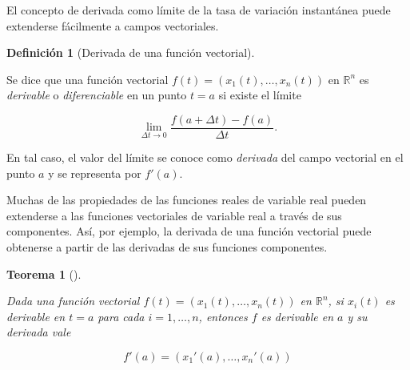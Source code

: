 \documentclass[
  a4paper,
]{scrreport}
\theoremstyle{definition}
\theoremstyle{plain}
\theoremstyle{plain}
\newtheorem{theorem}{Teorema}[chapter]
\theoremstyle{plain}
\theoremstyle{definition}
\newtheorem{definition}{Definición}[chapter]
\theoremstyle{remark}
\begin{document}
El concepto de derivada como límite de la tasa de variación instantánea
puede extenderse fácilmente a campos vectoriales.

\begin{definition}[Derivada de una función
vectorial]\protect\hypertarget{def-derivada-funcion-vectorial}{}\label{def-derivada-funcion-vectorial}

Se dice que una función vectorial \(f(t)=(x_1(t),\ldots,x_n(t))\) en
\(\mathbb{R}^n\) es \emph{derivable} o \emph{diferenciable} en un punto
\(t=a\) si existe el límite

\[
\lim_{\Delta t\rightarrow 0} \frac{f(a+\Delta t)-f(a)}{\Delta t}.
\]

En tal caso, el valor del límite se conoce como \emph{derivada} del
campo vectorial en el punto \(a\) y se representa por \(f'(a)\).

\end{definition}

Muchas de las propiedades de las funciones reales de variable real
pueden extenderse a las funciones vectoriales de variable real a través
de sus componentes. Así, por ejemplo, la derivada de una función
vectorial puede obtenerse a partir de las derivadas de sus funciones
componentes.

\begin{theorem}[]\protect\hypertarget{thm-derivada-funciones-vectoriales}{}\label{thm-derivada-funciones-vectoriales}

Dada una función vectorial \(f(t)=(x_1(t),\ldots,x_n(t))\) en
\(\mathbb{R}^n\), si \(x_i(t)\) es derivable en \(t=a\) para cada
\(i=1,\ldots,n\), entonces \(f\) es derivable en \(a\) y su derivada
vale

\[
f'(a)=(x_1'(a),\ldots,x_n'(a))
\]

\end{theorem}
\end{document}
